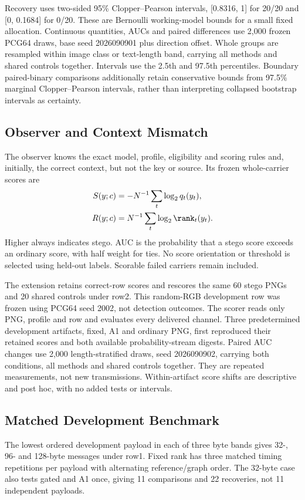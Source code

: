 Recovery uses two-sided 95\% Clopper--Pearson intervals, [0.8316, 1] for 20/20 and [0, 0.1684] for 0/20. These are Bernoulli working-model bounds for a small fixed allocation. Continuous quantities, AUCs and paired differences use 2,000 frozen PCG64 draws, base seed 2026090901 plus direction offset. Whole groups are resampled within image class or text-length band, carrying all methods and shared controls together. Intervals use the 2.5th and 97.5th percentiles. Boundary paired-binary comparisons additionally retain conservative bounds from 97.5\% marginal Clopper--Pearson intervals, rather than interpreting collapsed bootstrap intervals as certainty.

\subsection{Observer and Context Mismatch}
\label{sec:observer}
The observer knows the exact model, profile, eligibility and scoring rules and, initially, the correct context, but not the key or source. Its frozen whole-carrier scores are
\begin{align}
S(y;c)&=-N^{-1}\sum_t\log_2 q_t(y_t),\\
R(y;c)&=N^{-1}\sum_t\log_2\rank_t(y_t).
\end{align}
Higher always indicates stego. AUC is the probability that a stego score exceeds an ordinary score, with half weight for ties. No score orientation or threshold is selected using held-out labels. Scorable failed carriers remain included.

The extension retains correct-row scores and rescores the same 60 stego PNGs and 20 shared controls under row2. This random-RGB development row was frozen using PCG64 seed 2002, not detection outcomes. The scorer reads only PNG, profile and row and evaluates every delivered channel. Three predetermined development artifacts, fixed, A1 and ordinary PNG, first reproduced their retained scores and both available probability-stream digests. Paired AUC changes use 2,000 length-stratified draws, seed 2026090902, carrying both conditions, all methods and shared controls together. They are repeated measurements, not new transmissions. Within-artifact score shifts are descriptive and post hoc, with no added tests or intervals.

\subsection{Matched Development Benchmark}
The lowest ordered development payload in each of three byte bands gives 32-, 96- and 128-byte messages under row1. Fixed rank has three matched timing repetitions per payload with alternating reference/graph order. The 32-byte case also tests gated and A1 once, giving 11 comparisons and 22 recoveries, not 11 independent payloads.

